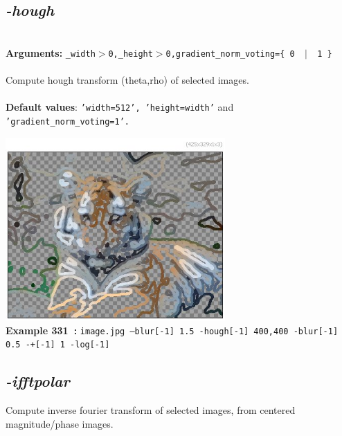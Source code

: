 \documentclass[a4paper,11pt,twoside]{book}
\begin{document}
\subsection{\emph{-hough} }\vspace*{-0.5em}
~\\\textbf{Arguments: } 
{\small \texttt{\_width$>$0,\_height$>$0,gradient\_norm\_voting=\{ 0 ~$|$~ 1 \}}}\\~\\
Compute hough transform (theta,rho) of selected images.
~\\~\\\textbf{Default values}: {\small \texttt{'width=512', 'height=width'} and \texttt{'gradient\_norm\_voting=1'.}}
\begin{center}\includegraphics[keepaspectratio=true,height=7cm,width=\textwidth]{img/gmic_def331.jpg}\\
{\footnotesize \textbf{Example 331~:} \texttt{image.jpg --blur[-1] 1.5 -hough[-1] 400,400 -blur[-1] 0.5 -+[-1] 1 -log[-1]}}
\end{center}

\subsection{\emph{-ifftpolar} }\vspace*{-0.5em}
Compute inverse fourier transform of selected images, from centered magnitude/phase images.
\end{document}
